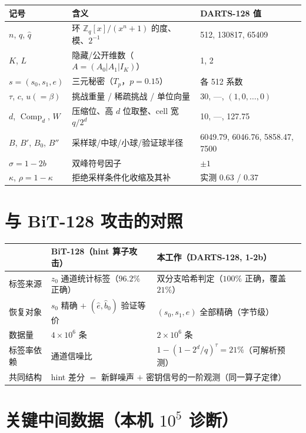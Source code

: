 \documentclass[UTF8,11pt,a4paper]{ctexart}
\newcommand{\Comp}{\operatorname{Comp}}
\begin{document}
\begin{center}\small
\begin{tabular}{@{}lll@{}}
\toprule
记号 & 含义 & DARTS-128 值 \\
\midrule
$n$, $q$, $\hat q$ & 环 $\mathbb Z_q[x]/(x^n{+}1)$ 的度、模、$2^{-1}$ & 512, 130817, 65409 \\
$K$, $L$ & 隐藏/公开维数（$A=(A_0|A_1|I_K)$） & 1, 2 \\
$s=(s_0,s_1,e)$ & 三元秘密（$T_p$，$p=0.15$） & 各 512 系数 \\
$\tau$, $c$, $u(=\beta)$ & 挑战重量 / 稀疏挑战 / 单位向量 & 30, ---, $(1,0,\dots,0)$ \\
$d$, $\Comp_d$, $W$ & 压缩位、高 $d$ 位取整、cell 宽 $q/2^d$ & 10, ---, 127.75 \\
$B$, $B'$, $B_0$, $B''$ & 采样球/中球/小球/验证球半径 & 6049.79, 6046.76, 5858.47, 7500 \\
$\sigma=1-2b$ & 双峰符号因子 & $\pm1$ \\
$\kappa$, $\rho=1-\kappa$ & 拒绝采样条件化收缩及其补 & 实测 0.63 / 0.37 \\
\bottomrule
\end{tabular}
\end{center}

\section{与 BiT-128 攻击的对照}

\begin{center}\small
\begin{tabular}{@{}lll@{}}
\toprule
 & BiT-128（hint 算子攻击） & 本工作（DARTS-128, 1-2b） \\
\midrule
标签来源 & $z_0$ 通道统计标签（$96.2\%$ 正确） & 双分支哈希判定（$100\%$ 正确，覆盖 $21\%$） \\
恢复对象 & $s_0$ 精确 $+$ $(\hat e,\hat b_0)$ 验证等价 & $(s_0,s_1,e)$ 全部精确（字节级） \\
数据量 & $4\times10^6$ 条 & $2\times10^6$ 条 \\
标签率依赖 & 通道信噪比 & $1-(1-2^d/q)^\tau=21\%$（可解析预测） \\
共同结构 & \multicolumn{2}{l}{hint 差分 $=$ 新鲜噪声 $+$ 密钥信号的一阶观测（同一算子定律）} \\
\bottomrule
\end{tabular}
\end{center}

\section{关键中间数据（本机 $10^5$ 诊断）}
\end{document}
